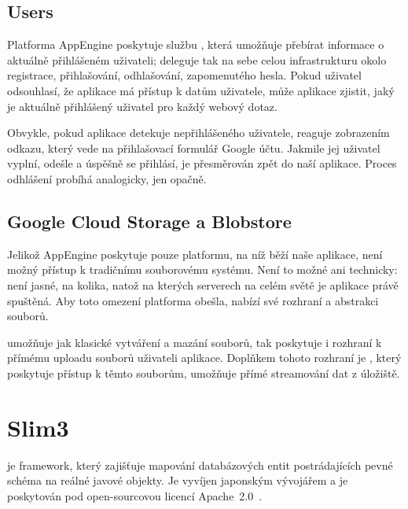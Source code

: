 \subsection{Users}

Platforma AppEngine poskytuje službu , která umožňuje přebírat informace o aktuálně přihlášeném uživateli; deleguje tak na sebe celou infrastrukturu okolo registrace, přihlašování, odhlašování, zapomenutého hesla.
Pokud uživatel odsouhlasí, že aplikace má přístup k datům uživatele, může aplikace zjistit, jaký je aktuálně přihlášený uživatel pro každý webový dotaz.

Obvykle, pokud aplikace detekuje nepřihlášeného uživatele, reaguje zobrazením odkazu, který vede na přihlašovací formulář Google účtu.
Jakmile jej uživatel vyplní,  odešle a úspěšně se přihlásí, je přesměrován zpět do naší aplikace.
Proces odhlášení probíhá analogicky, jen opačně.


\subsection{Google Cloud Storage a Blobstore}

Jelikož AppEngine poskytuje pouze platformu, na níž běží naše aplikace, není možný přístup k tradičnímu souborovému systému.
Není to možné ani technicky: není jasné, na kolika, natož na kterých serverech na celém světě je aplikace právě spuštěná.
Aby toto omezení platforma obešla, nabízí své rozhraní a abstrakci souborů.

 umožňuje jak klasické vytváření a mazání souborů, tak poskytuje i rozhraní k přímému uploadu souborů uživateli aplikace.
Doplňkem tohoto rozhraní je , který poskytuje přístup k těmto souborům, umožňuje přímé streamování dat z úložiště.

\section{Slim3}

 je framework, který zajišťuje mapování databázových entit postrádajících pevné schéma na reálné javové objekty.
Je vyvíjen japonským vývojářem  a je poskytován pod open-sourcovou licencí Apache~2.0~\cite{apache20}.

